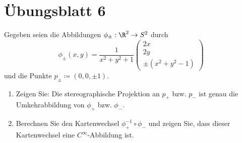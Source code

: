 %
\newpage
\setcounter{problemcounter}{0}
\section{Übungsblatt 6}

\begin{assignment}
  Gegeben seien die Abbildungen \( \phi_\pm : \R^2 \to S^2 \) durch
  \begin{equation*}
    \phi_\pm(x,y) = \frac{1}{x^2 + y^2 + 1} \left( \begin{smallmatrix}
      2x \\ 2y \\ \pm(x^2 + y^2 - 1)
    \end{smallmatrix} \right)
  \end{equation*}
  und die Punkte \( p_\pm \coloneqq (0,0,\pm 1) \).
  \begin{enumerate}[label= (\alph*)]
    \item Zeigen Sie: Die stereographische Projektion an \( p_+ \) bzw. \( p_- \) ist genau die Umkehrabbildung von \( \phi_+ \) bzw. \( \phi_- \).
    \item Berechnen Sie den Kartenwechsel \( \phi_+^{-1} \circ \phi_- \) und zeigen Sie, dass dieser Kartenwechsel eine \( C^\infty \)-Abbildung ist.
  \end{enumerate}
\end{assignment}

